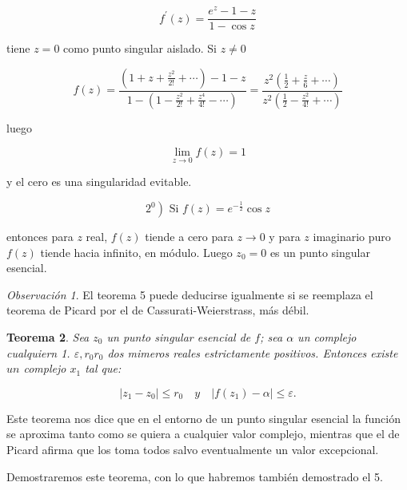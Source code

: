\documentclass[10pt]{article}
\theoremstyle{plain}
\newtheorem{theorem}{Teorema}[section]
\theoremstyle{definition}
\theoremstyle{remark}
\newtheorem{remark}[theorem]{Observación}
\begin{document}
$$
f^{\prime}(z)=\frac{e^{z}-1-z}{1-\cos z}
$$

tiene $z=0$ como punto singular aislado. Si $z \neq 0$

$$
f(z)=\frac{\left(1+z+\frac{z^{2}}{2!}+\cdots\right)-1-z}{1-\left(1-\frac{z^{2}}{2!}+\frac{z^{4}}{4!}-\cdots\right)}=\frac{z^{2}\left(\frac{1}{2}+\frac{z}{6}+\cdots\right)}{z^{2}\left(\frac{1}{2}-\frac{z^{2}}{4!}+\cdots\right)}
$$

luego

$$
\lim _{z \rightarrow 0} f(z)=1
$$

y el cero es una singularidad evitable.

$$
\left.2^{0}\right) \text { Si } f(z)=e^{-\frac{1}{2}} \cos z
$$

entonces para $z$ real, $f(z)$ tiende a cero para $z \rightarrow 0$ y para $z$ imaginario puro $f(z)$ tiende hacia infinito, en módulo. Luego $z_{0}=0$ es un punto singular esencial.

\begin{remark}
El teorema 5 puede deducirse igualmente si se reemplaza el teorema de Picard por el de Cassurati-Weierstrass, más débil.
\end{remark}

\begin{theorem}
Sea $z_{0}$ un punto singular esencial de $f$; sea $\alpha$ un complejo cualquiern 1. $\varepsilon, r_{0} r_{0}$ dos mimeros reales estrictamente positivos. Entonces existe $u n$ complejo $x_{1}$ tal que:

$$
\left|z_{1}-z_{0}\right| \leqslant r_{0} \quad y \quad\left|f\left(z_{1}\right)-\alpha\right| \leqslant \varepsilon .
$$
\end{theorem}

Este teorema nos dice que en el entorno de un punto singular esencial la función se aproxima tanto como se quiera a cualquier valor complejo, mientras que el de Picard afirma que los toma todos salvo eventualmente un valor excepcional.

Demostraremos este teorema, con lo que habremos también demostrado el 5.
\end{document}
